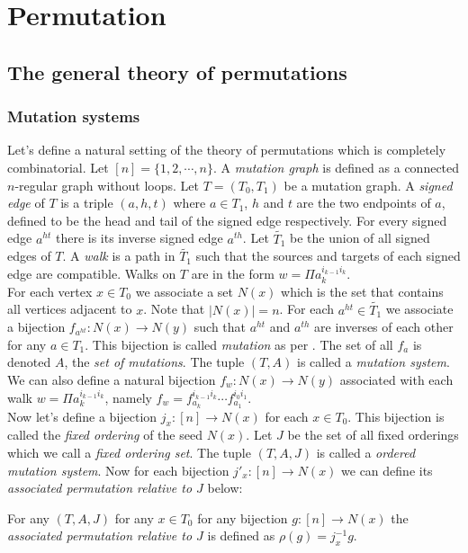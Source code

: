 \chapter{Permutation}\label{C1}
\section{The general theory of permutations}
\subsection{Mutation systems}
\indent Let's define a natural setting of the theory of permutations which is completely combinatorial. Let $[n]=\{1,2,\cdots,n\}$.  A \textit{mutation graph} is defined as a connected $n$-regular graph without loops. Let $T=(T_0,T_1)$ be a mutation graph. A \textit{signed edge} of $T$ is a triple $(a,h,t)$ where $a\in T_1$, $h$ and $t$ are the two endpoints of $a$, defined to be the head and tail of the signed edge respectively. For every signed edge $a^{ht}$ there is its inverse signed edge $a^{th}$. Let $\tilde{T_1}$ be the union of all signed edges of $T$. A \textit{walk} is a path in $\tilde{T_1}$ such that the sources and targets of each signed edge are compatible. Walks on $T$ are in the form  $w=\Pi a_k^{i_{k-1} i_k}$.\\ 
\indent For each vertex $x\in T_0$ we associate a set $N(x)$ which is the set that contains all vertices adjacent to $x$. Note that $|N(x)|=n$. For each $a^{ht}\in\tilde{T_1}$ we associate a bijection $f_{a^{ht}}: N(x)\to N(y)$ such that $a^{ht}$ and $a^{th}$ are inverses of each other for any $a\in T_1$. This bijection is called \textit{mutation} as per \cite{FZ06}. The set of all $f_a$ is denoted $A$, the \textit{set of mutations}. The tuple $(T,A)$ is called a \textit{mutation system}. We can also define a natural bijection $f_w:N(x)\to N(y)$ associated with each walk $w=\Pi a_k^{i_{k-1} i_k}$, namely $f_w=f_{a_k}^{i_{k-1}i_k}\cdots f_{a_1}^{i_0i_1}$.\\
\indent Now let's define a bijection $j_x:[n]\to N(x)$ for each $x\in T_0$. This bijection is called the \textit{fixed ordering} of the seed $N(x)$. Let $J$ be the set of all fixed orderings which we call a \textit{fixed ordering set}. The tuple $(T,A,J)$ is called a \textit{ordered mutation system}. Now for each bijection $j'_x:[n]\to N(x)$ we can define its \textit{associated permutation relative to $J$} below:\\
\begin{definition}
For any $(T,A,J)$ for any $x\in T_0$ for any bijection $g:[n]\to N(x)$ the \textit{associated permutation relative to $J$} is defined as $\rho(g)=j_x^{-1}g$. \\
\end{definition}
